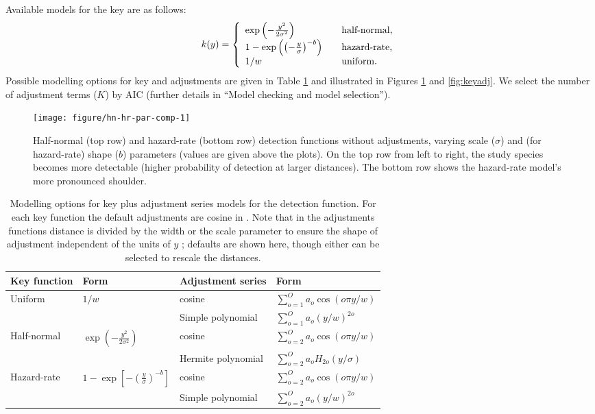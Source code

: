\documentclass[article]{jss}\usepackage[]{graphicx}\usepackage[]{color}
\makeatletter
\def\maxwidth{ %
  \ifdim\Gin@nat@width>\linewidth
    \linewidth
  \else
    \Gin@nat@width
  \fi
}
\makeatother
\begin{document}
Available models for the key are as follows:
$$
k(y) = \left\{
\begin{array}{l l}
  \exp\left(-\frac{y^2}{2 \sigma^2}\right) & \quad \text{half-normal,} \\
  1-\exp\left(\left(-\frac{y}{\sigma}\right)^{-b}\right) & \quad \text{hazard-rate,} \\
  1/w & \quad \text{uniform.}
\end{array} \right.
$$
Possible modelling options for key and adjustments are given in Table \ref{tab:keyadj} and illustrated in Figures \ref{fig:hnhr} and \ref{fig:keyadj}. We select the number of adjustment terms ($K$) by AIC (further details in ``Model checking and model selection'').

\begin{figure}
\begin{center}
\begin{Schunk}

\texttt{[image: figure/hn-hr-par-comp-1]} \end{Schunk}
\caption{Half-normal (top row) and hazard-rate (bottom row) detection functions without adjustments, varying scale ($\sigma$) and (for hazard-rate) shape ($b$) parameters (values are given above the plots). On the top row from left to right, the study species becomes more detectable (higher probability of detection at larger distances). The bottom row shows the hazard-rate model's more pronounced shoulder.}
\label{fig:hnhr}
\end{center}
\end{figure}

\begin{table}
\caption{Modelling options for key plus adjustment series models for the detection function. For each key function the default adjustments are cosine in . Note that in the adjustments functions distance is divided by the width or the scale parameter to ensure the shape of adjustment independent of the units of $y$ \citep{Marques:2007ey}; defaults are shown here, though either can be selected to rescale the distances.}
\begin{tabular}{llll}
\hline
Key function   & Form   & Adjustment series & Form\\
\hline
 Uniform  & $1/w$   & cosine  & $\sum_{o=1}^O a_o \cos(o \pi y/w)$ \\
 & & Simple polynomial & $\sum_{o=1}^O a_o (y/w)^{2o}$ \\
 Half-normal  & $\exp\left(-\frac{y^2}{2 \sigma^2}\right)$ & cosine  & $\sum_{o=2}^O a_o \cos(o \pi y/w)$ \\
 & & Hermite polynomial & $\sum_{o=2}^O a_o H_{2o}(y/\sigma)$ \\
 Hazard-rate  & $1-\exp\left[-\left(\frac{y}{\sigma}\right)^{-b}\right]$ & cosine  & $\sum_{o=2}^O a_o \cos(o \pi y/w)$ \\
 & & Simple polynomial & $\sum_{o=2}^O a_o (y/w)^{2o}$ \\
\hline
\end{tabular}
\label{tab:keyadj}
\end{table}
\end{document}
